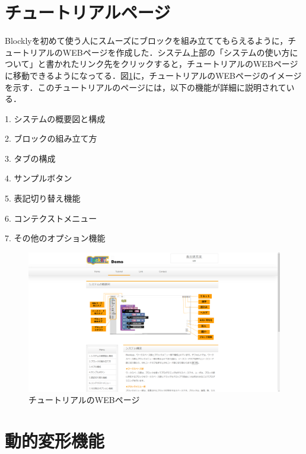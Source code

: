 \documentclass{risepaper}
\begin{document}
   \section{チュートリアルページ}
   
Blocklyを初めて使う人にスムーズにブロックを組み立ててもらえるように，チュートリアルのWEBページを作成した．システム上部の「システムの使い方について」と書かれたリンク先をクリックすると，チュートリアルのWEBページに移動できるようになってる．図\ref{fig:tutorial}に，チュートリアルのWEBページのイメージを示す．このチュートリアルのページには，以下の機能が詳細に説明されている．

1. システムの概要図と構成

2. ブロックの組み立て方

3. タブの構成

4. サンプルボタン

5. 表記切り替え機能

6. コンテクストメニュー

7. その他のオプション機能

\begin{figure}[h]
\begin{center}
\includegraphics[scale=0.5]{img/tutorial.PNG}
\caption{チュートリアルのWEBページ}%
\label{fig:tutorial}
\end{center}%
\end{figure}%


   \section{動的変形機能}
   
\end{document}
